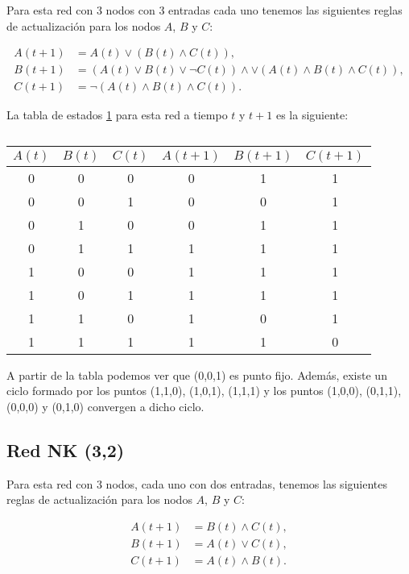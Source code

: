 \documentclass[letterpaper,12pt]{article}
\theoremstyle{plain}
\begin{document}
Para esta red con 3 nodos con 3 entradas cada uno tenemos las siguientes reglas de actualización para los nodos $A$, $B$ y $C$:

\begin{align}
    A(t+1) &= A(t) \lor (B(t) \land C(t) ), \\
    B(t+1) &= (A(t) \lor B(t) \lor \lnot C(t)) \land \lor (A(t) \land B(t) \land C(t)), \\
    C(t+1) &= \lnot (A(t) \land B(t) \land C(t)). 
\end{align}

La tabla de estados \ref*{tab:3} para esta red a tiempo $t$ y $t+1$ es la siguiente:

\begin{table}[h]
    \centering
    \begin{tabular}{|c|c|c|c|c|c|}
        \hline
        $A(t)$ & $B(t)$ & $C(t)$ & $A(t+1)$ & $B(t+1)$ & $C(t+1)$ \\
        \hline
        0 & 0 & 0 & 0 & 1 & 1  \\
        0 & 0 & 1 & 0 & 0 & 1  \\
        0 & 1 & 0 & 0 & 1 & 1  \\
        0 & 1 & 1 & 1 & 1 & 1  \\
        1 & 0 & 0 & 1 & 1 & 1  \\
        1 & 0 & 1 & 1 & 1 & 1  \\
        1 & 1 & 0 & 1 & 0 & 1  \\
        1 & 1 & 1 & 1 & 1 & 0  \\
        \hline
\end{tabular}
\caption{}
\label{tab:3}
\end{table}

A partir de la tabla podemos ver que (0,0,1) es punto fijo. Además, existe un ciclo formado por los puntos (1,1,0), (1,0,1), (1,1,1) y los puntos (1,0,0), (0,1,1), (0,0,0) y (0,1,0) convergen a dicho ciclo. 

\subsection*{Red NK (3,2)}

Para esta red con 3 nodos, cada uno con dos entradas, tenemos las siguientes reglas de actualización para los nodos $A$, $B$ y $C$:

\begin{align}
    A(t+1) &= B(t) \land C(t), \\
    B(t+1) &= A(t) \lor C(t), \\
    C(t+1) &= A(t) \land B(t). 
\end{align}
\end{document}
